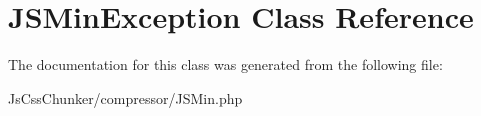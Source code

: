 \hypertarget{class_j_s_min_exception}{
\section{JSMinException Class Reference}
\label{class_j_s_min_exception}
}


The documentation for this class was generated from the following file:\begin{DoxyCompactItemize}
\item 
JsCssChunker/compressor/JSMin.php\end{DoxyCompactItemize}
